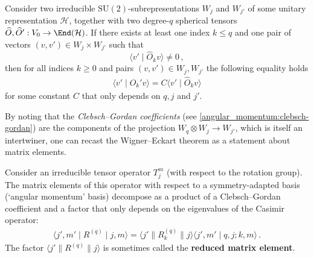     \begin{theorem}
        Consider two irreducible $\mathrm{SU}(2)$-subrepresentations $W_j$ and $W_{j'}$ of some unitary representation $\mathcal{H}$, together with two degree-$q$ spherical tensors $\widehat{O},\widehat{O}':V_0\rightarrow\End(\mathcal{H})$. If there exists at least one index $k\leq q$ and one pair of vectors $(v,v')\in W_j\times W_{j'}$ such that \[\langle v'\mid\widehat{O}_kv \rangle\neq0\,,\] then for all indices $k\geq 0$ and pairs $(v,v')\in W_j,W_{j'}$ the following equality holds
        \begin{gather}
            \langle v'\mid\widehat{O}_k'v \rangle = C\langle v'\mid\widehat{O}_kv \rangle
        \end{gather}
        for some constant $C$ that only depends on $q,j$ and $j'$.
    \end{theorem}
    By noting that the \textit{Clebsch--Gordan coefficients} (see \cref{angular_momentum:clebsch-gordan}) are the components of the projection $W_q\otimes W_j\rightarrow W_{j'}$, which is itself an intertwiner, one can recast the Wigner--Eckart theorem as a statement about matrix elements.
    \begin{result}
        Consider an irreducible tensor operator $T_j^m$ (with respect to the rotation group). The matrix elements of this operator with respect to a symmetry-adapted basis (`angular momentum' basis) decompose as a product of a Clebsch--Gordan coefficient and a factor that only depends on the eigenvalues of the Casimir operator:
        \begin{gather}
            \langle j',m'\mid R^{(q)}\mid j,m \rangle = \langle j'\|R_k^{(q)}\|j \rangle\langle j',m'\mid q,j;k,m \rangle\,.
        \end{gather}
        The factor $\langle j'\|R^{(q)}\|j \rangle$ is sometimes called the \textbf{reduced matrix element}.
    \end{result}